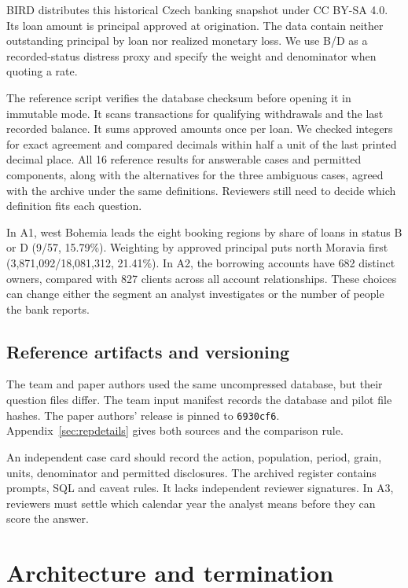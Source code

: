 \documentclass[11pt,a4paper,onecolumn,oneside]{rho-class/rho}
\begin{document}
BIRD distributes this historical Czech banking snapshot under CC BY-SA 4.0. Its loan amount is principal approved at origination. The data contain neither outstanding principal by loan nor realized monetary loss. We use B/D as a recorded-status distress proxy and specify the weight and denominator when quoting a rate.

The reference script verifies the database checksum before opening it in immutable mode. It scans transactions for qualifying withdrawals and the last recorded balance. It sums approved amounts once per loan. We checked integers for exact agreement and compared decimals within half a unit of the last printed decimal place. All 16 reference results for answerable cases and permitted components, along with the alternatives for the three ambiguous cases, agreed with the archive under the same definitions. Reviewers still need to decide which definition fits each question.

In A1, west Bohemia leads the eight booking regions by share of loans in status B or D (9/57, 15.79\%). Weighting by approved principal puts north Moravia first (3,871,092/18,081,312, 21.41\%). In A2, the borrowing accounts have 682 distinct owners, compared with 827 clients across all account relationships. These choices can change either the segment an analyst investigates or the number of people the bank reports.

\subsection{Reference artifacts and versioning}
The team and paper authors used the same uncompressed database, but their question files differ. The team input manifest records the database and pilot file hashes. The paper authors' release is pinned to \texttt{6930cf6}. Appendix~\ref{sec:repdetails} gives both sources and the comparison rule.

An independent case card should record the action, population, period, grain, units, denominator and permitted disclosures. The archived register contains prompts, SQL and caveat rules. It lacks independent reviewer signatures. In A3, reviewers must settle which calendar year the analyst means before they can score the answer.

\clearpage

\section{Architecture and termination}
\end{document}
